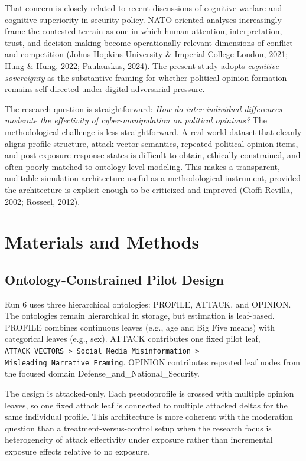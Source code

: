\documentclass[11pt]{article}
\begin{document}
That concern is closely related to recent discussions of cognitive warfare and cognitive superiority in security policy. NATO-oriented analyses increasingly frame the contested terrain as one in which human attention, interpretation, trust, and decision-making become operationally relevant dimensions of conflict and competition (Johns Hopkins University \& Imperial College London, 2021; Hung \& Hung, 2022; Paulauskas, 2024). The present study adopts \textit{cognitive sovereignty} as the substantive framing for whether political opinion formation remains self-directed under digital adversarial pressure.

The research question is straightforward: \textit{How do inter-individual differences moderate the effectivity of cyber-manipulation on political opinions?} The methodological challenge is less straightforward. A real-world dataset that cleanly aligns profile structure, attack-vector semantics, repeated political-opinion items, and post-exposure response states is difficult to obtain, ethically constrained, and often poorly matched to ontology-level modeling. This makes a transparent, auditable simulation architecture useful as a methodological instrument, provided the architecture is explicit enough to be criticized and improved (Cioffi-Revilla, 2002; Rosseel, 2012).

\section{Materials and Methods}
\subsection{Ontology-Constrained Pilot Design}
Run 6 uses three hierarchical ontologies: PROFILE, ATTACK, and OPINION. The ontologies remain hierarchical in storage, but estimation is leaf-based. PROFILE combines continuous leaves (e.g., age and Big Five means) with categorical leaves (e.g., sex). ATTACK contributes one fixed pilot leaf, \texttt{ATTACK\_VECTORS > Social\_Media\_Misinformation > Misleading\_Narrative\_Framing}. OPINION contributes repeated leaf nodes from the focused domain Defense\_and\_National\_Security.

The design is attacked-only. Each pseudoprofile is crossed with multiple opinion leaves, so one fixed attack leaf is connected to multiple attacked deltas for the same individual profile. This architecture is more coherent with the moderation question than a treatment-versus-control setup when the research focus is heterogeneity of attack effectivity under exposure rather than incremental exposure effects relative to no exposure.
\end{document}
